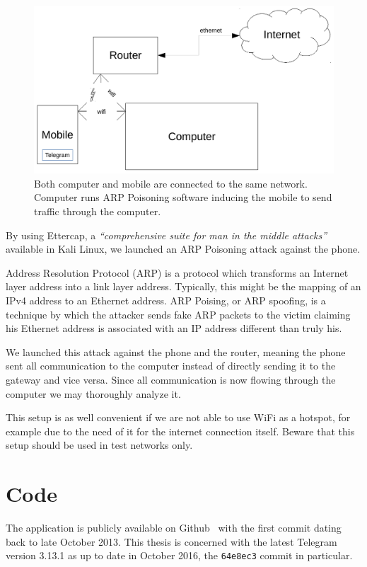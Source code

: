 \documentclass[thesis=M,english]{FITthesis}[2012/10/20]
\begin{document}
\begin{figure}[htb]
	\centering
	\includegraphics[width=1\textwidth]{setup-arp.pdf}
	\caption[Analysis setup 2]{Both computer and mobile are connected to the same network. Computer runs ARP Poisoning software inducing the mobile to send traffic through the computer.}
	\label{img:analysis-setup-arp}
\end{figure}


By using Ettercap, a \emph{``comprehensive suite for man in the middle attacks''}~\cite{ettercap-homepage} available in Kali Linux, we launched an ARP Poisoning attack against the phone.

Address Resolution Protocol (ARP) is a protocol which transforms an Internet layer address into a link layer address. Typically, this might be the mapping of an IPv4 address to an Ethernet address. ARP Poising, or ARP spoofing, is a technique by which the attacker sends fake ARP packets to the victim claiming his Ethernet address is associated with an IP address different than truly his.

We launched this attack against the phone and the router, meaning the phone sent all communication to the computer instead of directly sending it to the gateway and vice versa. Since all communication is now flowing through the computer we may thoroughly analyze it.

This setup is as well convenient if we are not able to use WiFi as a hotspot, for example due to the need of it for the internet connection itself. Beware that this setup should be used in test networks only.

\section{Code}

The application is publicly available on Github~\cite{github-telegram} with the first commit dating back to late October 2013. This thesis is concerned with the latest Telegram version 3.13.1 as up to date in October 2016, the \texttt{64e8ec3} commit in particular.
\end{document}
